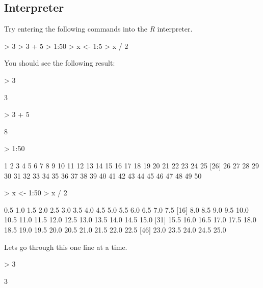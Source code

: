 \documentclass[10pt,letterpaper]{article}
\begin{document}
\subsection{Interpreter}

Try entering the following commands into the \emph{R} interpreter.

\begin{Schunk}
\begin{Sinput}
> 3
> 3 + 5
> 1:50
> x <- 1:5
> x / 2
\end{Sinput}
\end{Schunk}

You should see the following result:

\begin{Schunk}
\begin{Sinput}
> 3
\end{Sinput}
\begin{Soutput}
[1] 3
\end{Soutput}
\begin{Sinput}
> 3 + 5
\end{Sinput}
\begin{Soutput}
[1] 8
\end{Soutput}
\begin{Sinput}
> 1:50
\end{Sinput}
\begin{Soutput}
 [1]  1  2  3  4  5  6  7  8  9 10 11 12 13 14 15 16 17 18 19 20 21 22 23 24 25
[26] 26 27 28 29 30 31 32 33 34 35 36 37 38 39 40 41 42 43 44 45 46 47 48 49 50
\end{Soutput}
\begin{Sinput}
> x <- 1:50
> x / 2
\end{Sinput}
\begin{Soutput}
 [1]  0.5  1.0  1.5  2.0  2.5  3.0  3.5  4.0  4.5  5.0  5.5  6.0  6.5  7.0  7.5
[16]  8.0  8.5  9.0  9.5 10.0 10.5 11.0 11.5 12.0 12.5 13.0 13.5 14.0 14.5 15.0
[31] 15.5 16.0 16.5 17.0 17.5 18.0 18.5 19.0 19.5 20.0 20.5 21.0 21.5 22.0 22.5
[46] 23.0 23.5 24.0 24.5 25.0
\end{Soutput}
\end{Schunk}

Lets go through this one line at a time.

\begin{Schunk}
\begin{Sinput}
> 3
\end{Sinput}
\begin{Soutput}
[1] 3
\end{Soutput}
\end{Schunk}
\end{document}
